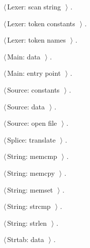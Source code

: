 \documentclass[11pt,a4paper,twoside,openright,DIV=15]{scrbook}
\theoremstyle{definition}
\theoremstyle{plain}
\theoremstyle{remark}
\begin{document}
{\begin{list}{}{\setlength{\itemsep}{-\parsep}\setlength{\itemindent}{-\leftmargin}}
\item $\langle\,$Lexer: scan string\nobreak\ {\footnotesize {}}$\,\rangle$ {\footnotesize {\NWtxtRefIn} .}
\item $\langle\,$Lexer: token constants\nobreak\ {\footnotesize {}}$\,\rangle$ {\footnotesize {\NWtxtRefIn} .
}
\item $\langle\,$Lexer: token names\nobreak\ {\footnotesize {}}$\,\rangle$ {\footnotesize {\NWtxtRefIn} .}
\item $\langle\,$Main: data\nobreak\ {\footnotesize {}}$\,\rangle$ {\footnotesize {\NWtxtRefIn} .}
\item $\langle\,$Main: entry point\nobreak\ {\footnotesize {}}$\,\rangle$ {\footnotesize {\NWtxtRefIn} .}
\item $\langle\,$Source: constants\nobreak\ {\footnotesize {}}$\,\rangle$ {\footnotesize {\NWtxtRefIn} .}
\item $\langle\,$Source: data\nobreak\ {\footnotesize {}}$\,\rangle$ {\footnotesize {\NWtxtRefIn} .}
\item $\langle\,$Source: open file\nobreak\ {\footnotesize {}}$\,\rangle$ {\footnotesize {\NWtxtRefIn} .}
\item $\langle\,$Splice: translate\nobreak\ {\footnotesize {}}$\,\rangle$ {\footnotesize {\NWtxtRefIn} .}
\item $\langle\,$String: memcmp\nobreak\ {\footnotesize {}}$\,\rangle$ {\footnotesize {\NWtxtRefIn} .}
\item $\langle\,$String: memcpy\nobreak\ {\footnotesize {}}$\,\rangle$ {\footnotesize {\NWtxtRefIn} .}
\item $\langle\,$String: memset\nobreak\ {\footnotesize {}}$\,\rangle$ {\footnotesize {\NWtxtRefIn} .}
\item $\langle\,$String: strcmp\nobreak\ {\footnotesize {}}$\,\rangle$ {\footnotesize {\NWtxtRefIn} .}
\item $\langle\,$String: strlen\nobreak\ {\footnotesize {}}$\,\rangle$ {\footnotesize {\NWtxtRefIn} .}
\item $\langle\,$Strtab: data\nobreak\ {\footnotesize {}}$\,\rangle$ {\footnotesize {\NWtxtRefIn} .}

\end{list}}
\end{document}

